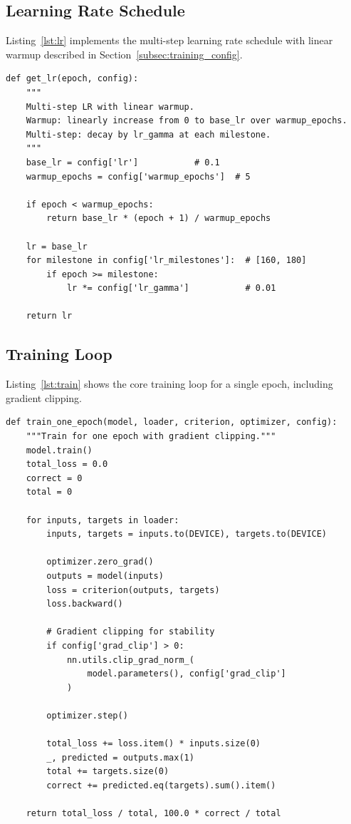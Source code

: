 \documentclass[12pt,a4paper]{article}
\begin{document}
\subsection{Learning Rate Schedule}
\label{app:lr_code}

Listing~\ref{lst:lr} implements the multi-step learning rate schedule with linear warmup described in Section~\ref{subsec:training_config}.

\begin{lstlisting}[caption={Multi-step learning rate schedule with linear warmup.}, label=lst:lr]
def get_lr(epoch, config):
    """
    Multi-step LR with linear warmup.
    Warmup: linearly increase from 0 to base_lr over warmup_epochs.
    Multi-step: decay by lr_gamma at each milestone.
    """
    base_lr = config['lr']           # 0.1
    warmup_epochs = config['warmup_epochs']  # 5
    
    if epoch < warmup_epochs:
        return base_lr * (epoch + 1) / warmup_epochs
    
    lr = base_lr
    for milestone in config['lr_milestones']:  # [160, 180]
        if epoch >= milestone:
            lr *= config['lr_gamma']           # 0.01
    
    return lr
\end{lstlisting}

\subsection{Training Loop}
\label{app:train_code}

Listing~\ref{lst:train} shows the core training loop for a single epoch, including gradient clipping.

\begin{lstlisting}[caption={Training loop for one epoch with gradient clipping.}, label=lst:train]
def train_one_epoch(model, loader, criterion, optimizer, config):
    """Train for one epoch with gradient clipping."""
    model.train()
    total_loss = 0.0
    correct = 0
    total = 0
    
    for inputs, targets in loader:
        inputs, targets = inputs.to(DEVICE), targets.to(DEVICE)
        
        optimizer.zero_grad()
        outputs = model(inputs)
        loss = criterion(outputs, targets)
        loss.backward()
        
        # Gradient clipping for stability
        if config['grad_clip'] > 0:
            nn.utils.clip_grad_norm_(
                model.parameters(), config['grad_clip']
            )
        
        optimizer.step()
        
        total_loss += loss.item() * inputs.size(0)
        _, predicted = outputs.max(1)
        total += targets.size(0)
        correct += predicted.eq(targets).sum().item()
    
    return total_loss / total, 100.0 * correct / total
\end{lstlisting}
\end{document}
